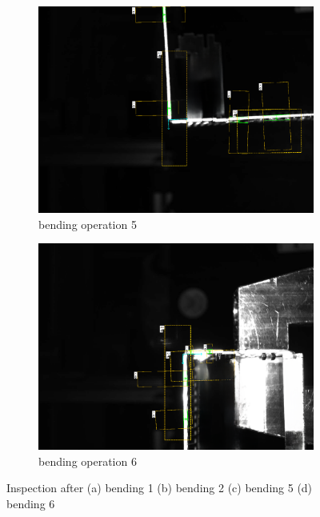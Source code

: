 \begin{figure}[h]
\begin{subfigure}{0.48\textwidth}
        \label{subfig:inspection-2}
        \vspace{0.5cm}
    \end{subfigure}\hspace{0.25cm}
    \begin{subfigure}{0.48\textwidth}
        \centering
        \includegraphics[width=\textwidth]{figures/008_inspection/inspection_5_overlay_cleanup.png}
        \caption{bending operation 5}
        \label{subfig:inspection-5}
        \vspace{0.25cm}
    \end{subfigure}\hspace{0.25cm}
    \begin{subfigure}{0.48\textwidth}
        \centering
        \includegraphics[width=\textwidth]{figures/008_inspection/inspection_6_overlay_cleanup.png}
        \caption{bending operation 6}
        \label{subfig:inspection-6}
        \vspace{0.25cm}
    \end{subfigure}\hspace{0.25cm}
    \caption{Inspection after (a) bending 1 (b) bending 2 (c) bending 5 (d) bending 6}
    \label{fig:bending-inspection}
\end{figure}

